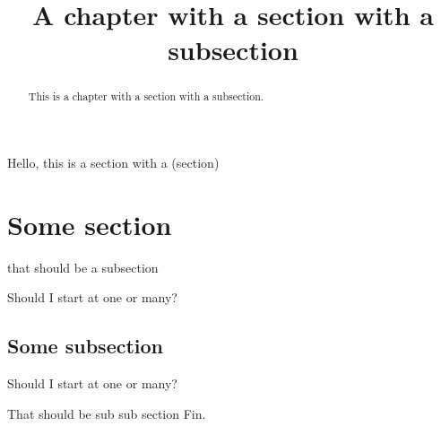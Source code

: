 \documentclass{ximera}
\title{A chapter with a section with a subsection}
\providecommand{\xmsection}{\section}
\providecommand{\xmsubsection}{\subsection}
\begin{document}
\begin{abstract}
  This is a chapter with a section with a subsection.
\end{abstract}
\maketitle




Hello, this is a section with a (section)

\xmsection{Some section}

that should be a subsection


\begin{theorem}
  Should I start at one or many?
\end{theorem}

\xmsubsection{Some subsection}

\begin{theorem}
  Should I start at one or many?
\end{theorem}


That should be sub sub section
Fin.
\end{document}

